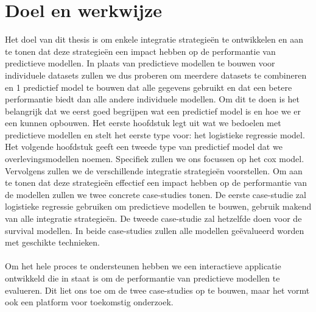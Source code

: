 \section{Doel en werkwijze}
Het doel van dit thesis is om enkele integratie strategie\"en te ontwikkelen en aan te tonen dat deze strategie\"en een impact hebben op de performantie van predictieve modellen. In plaats van predictieve modellen te bouwen voor individuele datasets zullen we dus proberen om meerdere datasets te combineren en 1 predictief model te bouwen dat alle gegevens gebruikt en dat een betere performantie biedt dan alle andere individuele modellen. Om dit te doen is het belangrijk dat we eerst goed begrijpen wat een predictief model is en hoe we er een kunnen opbouwen. Het eerste hoofdstuk legt uit wat we bedoelen met predictieve modellen en stelt het eerste type voor: het logistieke regressie model. Het volgende hoofdstuk geeft een tweede type van predictief model dat we overlevingsmodellen noemen. Specifiek zullen we ons focussen op het cox model. Vervolgens zullen we de verschillende integratie strategie\"en voorstellen. Om aan te tonen dat deze strategie\"en effectief een impact hebben op de performantie van de modellen zullen we twee concrete case-studies tonen. De eerste case-studie zal logistieke regressie gebruiken om predictieve modellen te bouwen, gebruik makend van alle integratie strategie\"en. De tweede case-studie zal hetzelfde doen voor de survival modellen. In beide case-studies zullen alle modellen ge\"evalueerd worden met geschikte technieken. \\ \\
Om het hele proces te ondersteunen hebben we een interactieve applicatie ontwikkeld die in staat is om de performantie van predictieve modellen te evalueren. Dit liet ons toe om de twee case-studies op te bouwen, maar het vormt ook een platform voor toekomstig onderzoek.
